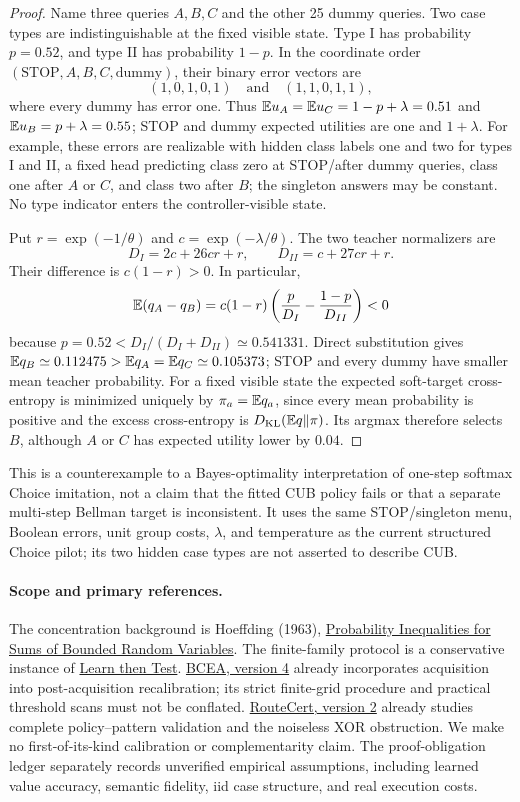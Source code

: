 \begin{proof}
Name three queries $A,B,C$ and the other 25 dummy queries. Two case types
are indistinguishable at the fixed visible state. Type I has probability
$p=0.52$, and type II has probability $1-p$. In the coordinate order
$(\mathrm{STOP},A,B,C,\mathrm{dummy})$, their binary error vectors are
\[
 (1,0,1,0,1)\quad\text{and}\quad(1,1,0,1,1),
\]
where every dummy has error one. Thus
$\mathbb{E} u_A=\mathbb{E} u_C=1-p+\lambda=0.51$ and
$\mathbb{E} u_B=p+\lambda=0.55$; STOP and dummy expected utilities are one
and $1+\lambda$. For example, these errors are realizable with hidden
class labels one and two for types I and II, a fixed head predicting
class zero at STOP/after dummy queries, class one after $A$ or $C$, and
class two after $B$; the singleton answers may be constant. No type
indicator enters the controller-visible state.

Put $r=\exp(-1/\theta)$ and $c=\exp(-\lambda/\theta)$. The two teacher
normalizers are
\[
 D_I=2c+26cr+r,\qquad D_{II}=c+27cr+r.
\]
Their difference is $c(1-r)>0$. In particular,
\[
 \mathbb{E}(q_A-q_B)=c(1-r)
   \left(\frac{p}{D_I}-\frac{1-p}{D_{II}}\right)<0
\]
because $p=0.52<D_I/(D_I+D_{II})\simeq0.541331$. Direct substitution
gives $\mathbb{E} q_B\simeq0.112475>\mathbb{E} q_A=\mathbb{E} q_C\simeq0.105373$;
STOP and every dummy have smaller mean teacher probability. For a
fixed visible state the expected soft-target cross-entropy is minimized
uniquely by $\pi_a=\mathbb{E} q_a$, since every mean probability is positive and
the excess cross-entropy is $D_{\rm KL}(\mathbb{E} q\Vert\pi)$. Its argmax
therefore selects $B$, although $A$ or $C$ has expected utility lower
by $0.04$.
\end{proof}

This is a counterexample to a Bayes-optimality interpretation of
one-step softmax Choice imitation, not a claim that the fitted CUB policy
fails or that a separate multi-step Bellman target is inconsistent. It
uses the same STOP/singleton menu, Boolean errors, unit group costs,
$\lambda$, and temperature as the current structured Choice pilot; its
two hidden case types are not asserted to describe CUB.

\paragraph{Scope and primary references.}
The concentration background is Hoeffding (1963),
\href{https://doi.org/10.1080/01621459.1963.10500830}
{Probability Inequalities for Sums of Bounded Random Variables}.
The finite-family protocol is a conservative instance of
\href{https://arxiv.org/abs/2110.01052}{Learn then Test}.
\href{https://arxiv.org/html/2606.16667v4}{BCEA, version 4}
already incorporates acquisition into post-acquisition recalibration;
its strict finite-grid procedure and practical threshold scans must not
be conflated.
\href{https://arxiv.org/html/2608.15520v2}{RouteCert, version 2}
already studies complete policy--pattern validation and the noiseless
XOR obstruction. We make no first-of-its-kind calibration or
complementarity claim. The proof-obligation ledger separately records
unverified empirical assumptions, including learned value accuracy,
semantic fidelity, iid case structure, and real execution costs.
